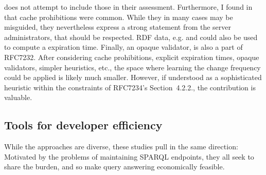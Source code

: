 does not attempt to include those in their assessment. Furthermore, I
found in \cite{kjernsmo_survey_2015} that cache prohibitions were
common. While they in many cases may be misguided, they nevertheless
express a strong statement from the server administrators, that should
be respected. RDF data, e.g.  and
 could also be used to compute a expiration
time. Finally, an opaque validator,  is also a part of
RFC7232. After considering cache prohibitions, explicit expiration
times, opaque validators, simpler heuristics, etc., the space where
learning the change frequency could be applied is likely much
smaller. However, if understood as a sophisticated heuristic within
the constraints of RFC7234's Section~4.2.2., the contribution is
valuable.

\subsection{Tools for developer efficiency}


While the approaches are diverse, these studies pull in the same
direction: Motivated by the problems of maintaining SPARQL endpoints,
they all seek to share the burden, and so make query answering
economically feasible.



